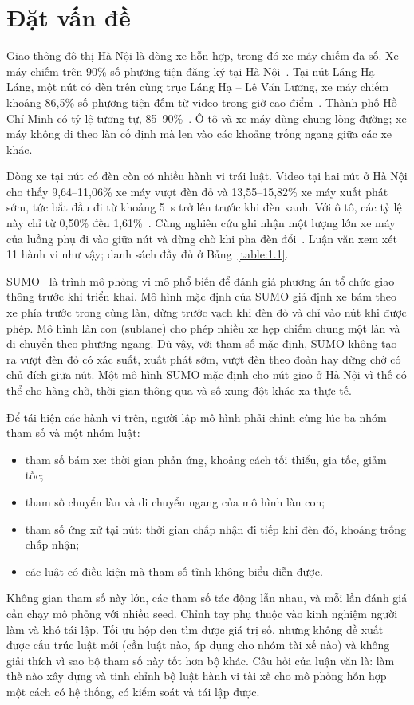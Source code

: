 \documentclass[../DoAn.tex]{subfiles}
\begin{document}
\section{Đặt vấn đề}
\label{section:1.1}

Giao thông đô thị Hà Nội là dòng xe hỗn hợp, trong đó xe máy chiếm đa số. Xe máy chiếm trên 90\% số phương tiện đăng ký tại Hà Nội~\cite{nguyen2022motorcycles}. Tại nút Láng Hạ -- Láng, một nút có đèn trên cùng trục Láng Hạ -- Lê Văn Lương, xe máy chiếm khoảng 86,5\% số phương tiện đếm từ video trong giờ cao điểm~\cite{mai2019signal}. Thành phố Hồ Chí Minh có tỷ lệ tương tự, 85--90\%~\cite{nguyen2026surtrac}. Ô tô và xe máy dùng chung lòng đường; xe máy không đi theo làn cố định mà len vào các khoảng trống ngang giữa các xe khác.

Dòng xe tại nút có đèn còn có nhiều hành vi trái luật. Video tại hai nút ở Hà Nội cho thấy 9,64--11,06\% xe máy vượt đèn đỏ và 13,55--15,82\% xe máy xuất phát sớm, tức bắt đầu đi từ khoảng 5~s trở lên trước khi đèn xanh. Với ô tô, các tỷ lệ này chỉ từ 0,50\% đến 1,61\%~\cite{mai2019signal}. Cùng nghiên cứu ghi nhận một lượng lớn xe máy của luồng phụ đi vào giữa nút và dừng chờ khi pha đèn đổi~\cite{mai2019signal}. Luận văn xem xét 11 hành vi như vậy; danh sách đầy đủ ở Bảng~\ref{table:1.1}.

SUMO~\cite{lopez2018sumo} là trình mô phỏng vi mô phổ biến để đánh giá phương án tổ chức giao thông trước khi triển khai. Mô hình mặc định của SUMO giả định xe bám theo xe phía trước trong cùng làn, dừng trước vạch khi đèn đỏ và chỉ vào nút khi được phép. Mô hình làn con (sublane) cho phép nhiều xe hẹp chiếm chung một làn và di chuyển theo phương ngang. Dù vậy, với tham số mặc định, SUMO không tạo ra vượt đèn đỏ có xác suất, xuất phát sớm, vượt đèn theo đoàn hay dừng chờ có chủ đích giữa nút. Một mô hình SUMO mặc định cho nút giao ở Hà Nội vì thế có thể cho hàng chờ, thời gian thông qua và số xung đột khác xa thực tế.

Để tái hiện các hành vi trên, người lập mô hình phải chỉnh cùng lúc ba nhóm tham số và một nhóm luật:
\begin{itemize}
    \item tham số bám xe: thời gian phản ứng, khoảng cách tối thiểu, gia tốc, giảm tốc;
    \item tham số chuyển làn và di chuyển ngang của mô hình làn con;
    \item tham số ứng xử tại nút: thời gian chấp nhận đi tiếp khi đèn đỏ, khoảng trống chấp nhận;
    \item các luật có điều kiện mà tham số tĩnh không biểu diễn được.
\end{itemize}
Không gian tham số này lớn, các tham số tác động lẫn nhau, và mỗi lần đánh giá cần chạy mô phỏng với nhiều seed. Chỉnh tay phụ thuộc vào kinh nghiệm người làm và khó tái lập. Tối ưu hộp đen tìm được giá trị số, nhưng không đề xuất được cấu trúc luật mới (cần luật nào, áp dụng cho nhóm tài xế nào) và không giải thích vì sao bộ tham số này tốt hơn bộ khác. Câu hỏi của luận văn là: làm thế nào xây dựng và tinh chỉnh bộ luật hành vi tài xế cho mô phỏng hỗn hợp một cách có hệ thống, có kiểm soát và tái lập được.
\end{document}
